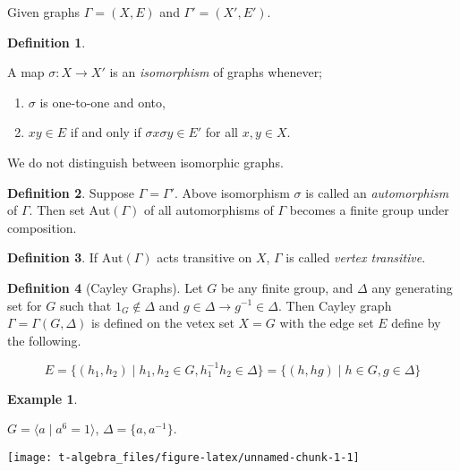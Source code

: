 \documentclass[
]{book}
\providecommand{\tightlist}{%
  \setlength{\itemsep}{0pt}\setlength{\parskip}{0pt}}
\theoremstyle{definition}
\newtheorem{definition}{Definition}[chapter]
\theoremstyle{definition}
\newtheorem{example}{Example}[chapter]
\theoremstyle{definition}
\theoremstyle{definition}
\theoremstyle{remark}
\begin{document}
Given graphs \(\Gamma = (X, E)\) and \(\Gamma' = (X', E')\).

\begin{definition}
\protect\hypertarget{def:isom}{}\label{def:isom}

A map \(\sigma: X \to X'\) is an \emph{isomorphism} of graphs whenever;

\begin{enumerate}
\def\labelenumi{\roman{enumi}.}
\tightlist
\item
  \(\sigma\) is one-to-one and onto,
\item
  \(xy\in E\) if and only if \(\sigma x \sigma y \in E'\) for all \(x, y\in X\).
\end{enumerate}

\end{definition}

We do not distinguish between isomorphic graphs.

\begin{definition}
\protect\hypertarget{def:auto}{}\label{def:auto}Suppose \(\Gamma = \Gamma'\). Above isomorphism \(\sigma\) is called an \emph{automorphism} of \(\Gamma\). Then set \(\mathrm{Aut}(\Gamma)\) of all automorphisms of \(\Gamma\) becomes a finite group under composition.
\end{definition}

\begin{definition}
\protect\hypertarget{def:transitive}{}\label{def:transitive}If \(\mathrm{Aut}(\Gamma)\) acts transitive on \(X\), \(\Gamma\) is called \emph{vertex transitive}.
\end{definition}

\begin{definition}[Cayley Graphs]
\protect\hypertarget{def:cayley}{}\label{def:cayley}Let \(G\) be any finite group, and \(\Delta\) any generating set for \(G\) such that \(1_G \not\in \Delta\) and \(g\in \Delta \to g^{-1}\in \Delta\).
Then Cayley graph \(\Gamma = \Gamma(G, \Delta)\) is defined on the vetex set \(X = G\) with the edge set \(E\) define by the following. 

\[E = \{(h_1,h_2)\mid h_1, h_2\in G, h_1^{-1}h_2\in \Delta\} = \{(h, hg) \mid h\in G, g\in \Delta\}\]
\end{definition}

\begin{example}
\protect\hypertarget{exm:cyclic6}{}\label{exm:cyclic6}

\(G = \langle a \mid a^6 = 1\rangle\), \(\Delta = \{a, a^{-1}\}\).

\begin{center}\texttt{[image: t-algebra\_files/figure-latex/unnamed-chunk-1-1]} \end{center}

\end{example}
\end{document}
